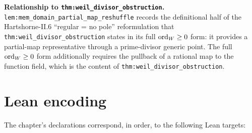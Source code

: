 \begin{remark}
  \label{rmk:mem_domain_partial_map_reshuffle_scope}
  \textbf{Relationship to \texttt{thm:weil_divisor_obstruction}.}
  \texttt{lem:mem_domain_partial_map_reshuffle} records the definitional half of
  the Hartshorne-II.6 ``regular = no pole'' reformulation that
  \texttt{thm:weil_divisor_obstruction} states in its full \(\operatorname{ord}_W \geq 0\)
  form: it provides a partial-map representative through a prime-divisor generic
  point. The full \(\operatorname{ord}_W \geq 0\) form additionally requires the pullback of a
  rational map to the function field, which is the content of
  \texttt{thm:weil_divisor_obstruction}.
\end{remark}

\section{Lean encoding}
\label{sec:codim1_lean_encoding}

The chapter's declarations correspond, in order, to the following Lean targets:

